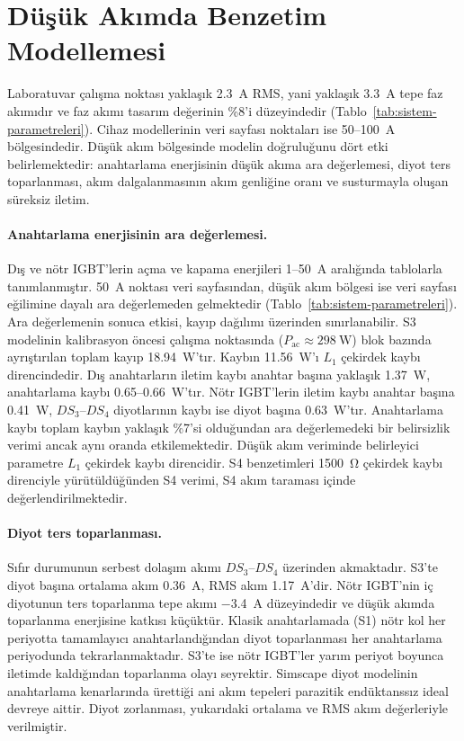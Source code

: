 \section{Düşük Akımda Benzetim Modellemesi}
\label{sec:dusuk-akim-modelleme}

Laboratuvar çalışma noktası yaklaşık \SI{2.3}{\ampere} RMS, yani yaklaşık \SI{3.3}{\ampere} tepe faz akımıdır ve faz akımı tasarım değerinin \%8'i düzeyindedir (Tablo~\ref{tab:sistem-parametreleri}). Cihaz modellerinin veri sayfası noktaları ise \num{50}--\SI{100}{\ampere} bölgesindedir. Düşük akım bölgesinde modelin doğruluğunu dört etki belirlemektedir: anahtarlama enerjisinin düşük akıma ara değerlemesi, diyot ters toparlanması, akım dalgalanmasının akım genliğine oranı ve susturmayla oluşan süreksiz iletim.

\paragraph{Anahtarlama enerjisinin ara değerlemesi.} Dış ve nötr IGBT'lerin açma ve kapama enerjileri \num{1}--\SI{50}{\ampere} aralığında tablolarla tanımlanmıştır. \SI{50}{\ampere} noktası veri sayfasından, düşük akım bölgesi ise veri sayfası eğilimine dayalı ara değerlemeden gelmektedir (Tablo~\ref{tab:sistem-parametreleri}). Ara değerlemenin sonuca etkisi, kayıp dağılımı üzerinden sınırlanabilir. S3 modelinin kalibrasyon öncesi çalışma noktasında ($P_{\mathrm{ac}}\approx\SI{298}{\watt}$) blok bazında ayrıştırılan toplam kayıp \SI{18.94}{\watt}'tır. Kaybın \SI{11.56}{\watt}'ı $L_1$ çekirdek kaybı direncindedir. Dış anahtarların iletim kaybı anahtar başına yaklaşık \SI{1.37}{\watt}, anahtarlama kaybı \num{0.65}--\SI{0.66}{\watt}'tır. Nötr IGBT'lerin iletim kaybı anahtar başına \SI{0.41}{\watt}, $DS_3$--$DS_4$ diyotlarının kaybı ise diyot başına \SI{0.63}{\watt}'tır. Anahtarlama kaybı toplam kaybın yaklaşık \%7'si olduğundan ara değerlemedeki bir belirsizlik verimi ancak aynı oranda etkilemektedir. Düşük akım veriminde belirleyici parametre $L_1$ çekirdek kaybı direncidir. S4 benzetimleri \SI{1500}{\ohm} çekirdek kaybı direnciyle yürütüldüğünden S4 verimi, S4 akım taraması içinde değerlendirilmektedir.

\paragraph{Diyot ters toparlanması.} Sıfır durumunun serbest dolaşım akımı $DS_3$--$DS_4$ üzerinden akmaktadır. S3'te diyot başına ortalama akım \SI{0.36}{\ampere}, RMS akım \SI{1.17}{\ampere}'dir. Nötr IGBT'nin iç diyotunun ters toparlanma tepe akımı \SI{-3.4}{\ampere} düzeyindedir ve düşük akımda toparlanma enerjisine katkısı küçüktür. Klasik anahtarlamada (S1) nötr kol her periyotta tamamlayıcı anahtarlandığından diyot toparlanması her anahtarlama periyodunda tekrarlanmaktadır. S3'te ise nötr IGBT'ler yarım periyot boyunca iletimde kaldığından toparlanma olayı seyrektir. Simscape diyot modelinin anahtarlama kenarlarında ürettiği ani akım tepeleri parazitik endüktanssız ideal devreye aittir. Diyot zorlanması, yukarıdaki ortalama ve RMS akım değerleriyle verilmiştir.

